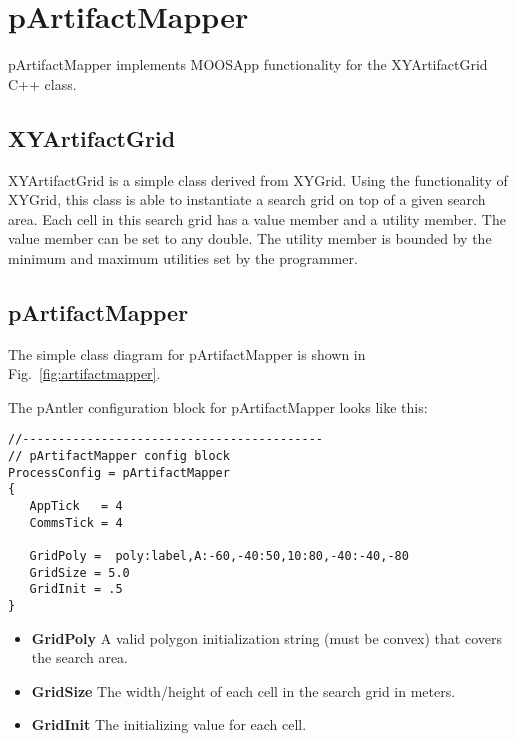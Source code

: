 \section{pArtifactMapper}
\label{pArtifactMapper}

pArtifactMapper implements MOOSApp functionality for the XYArtifactGrid C++ class.

\subsection{XYArtifactGrid}
\label{XYArtifactGrid}

XYArtifactGrid is a simple class derived from XYGrid.  Using the functionality of XYGrid, this class is able to instantiate a search grid on top of a given search area.  Each cell in this search grid has a value member and a utility member.  The value member can be set to any double.  The utility member is bounded by the minimum and maximum utilities set by the programmer.

\subsection{pArtifactMapper}
The simple class diagram for pArtifactMapper is shown in Fig.~\ref{fig:artifactmapper}.


The pAntler configuration block for pArtifactMapper looks like this:
\begin{verbatim}
//------------------------------------------
// pArtifactMapper config block
ProcessConfig = pArtifactMapper
{
   AppTick   = 4
   CommsTick = 4
   
   GridPoly =  poly:label,A:-60,-40:50,10:80,-40:-40,-80
   GridSize = 5.0
   GridInit = .5
}
\end{verbatim}

\begin{itemize}
\item {\bf GridPoly}  A valid polygon initialization string (must be convex) that covers the search area.
\item {\bf GridSize}  The width/height of each cell in the search grid in meters.
\item {\bf GridInit}  The initializing value for each cell.
\end{itemize}
